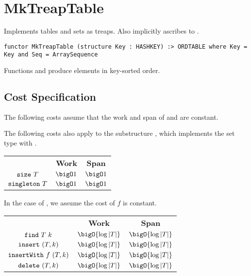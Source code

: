 \chapter{MkTreapTable}
\label{ch:treap-table}
\begin{preamble}
Implements tables and sets as treaps. Also implicitly ascribes to .
\begin{verbatim}
functor MkTreapTable (structure Key : HASHKEY) :> ORDTABLE where Key = Key and Seq = ArraySequence
\end{verbatim}
\end{preamble}

\begin{gram}
Functions  and  produce elements in key-sorted order.
\end{gram}

\section{Cost Specification}

\begin{gram}
The following costs assume that the work and span of 
and  are constant.
\end{gram}

\begin{gram}
The following costs also apply to the substructure , which implements
the set type with .
\end{gram}

\begin{costspec}
\begin{tabular}{c|c|c}
& \textbf{Work} & \textbf{Span} \\
$\texttt{size}~T$ & $\bigO 1$ & $\bigO 1$ \\
$\texttt{singleton}~T$ & $\bigO 1$ & $\bigO 1$ \\
\end{tabular}
\end{costspec}

\begin{costspec}
In the case of , we assume the cost of $f$ is constant.
\begin{tabular}{c|c|c}
& \textbf{Work} & \textbf{Span} \\
$\texttt{find}~T~k$ & $\bigO{\log|T|}$ & $\bigO{\log|T|}$ \\
$\texttt{insert}~(T, k)$ & $\bigO{\log|T|}$ & $\bigO{\log|T|}$ \\
$\texttt{insertWith}~f~(T, k)$ & $\bigO{\log|T|}$ & $\bigO{\log|T|}$ \\
$\texttt{delete}~(T, k)$ & $\bigO{\log|T|}$ & $\bigO{\log|T|}$
\end{tabular}
\end{costspec}

